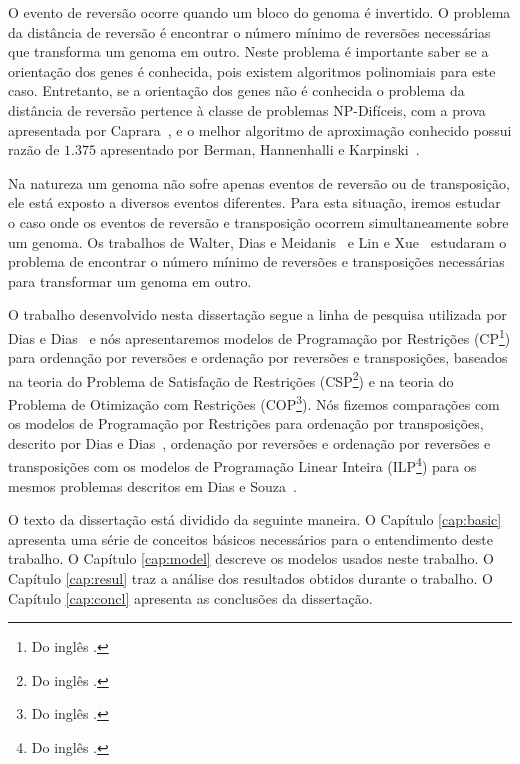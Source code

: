 O evento de reversão ocorre quando um bloco do genoma é invertido. O
problema da distância de reversão é encontrar o número mínimo de
reversões necessárias que transforma um genoma em outro. Neste
problema é importante saber se a orientação dos genes é conhecida,
pois existem algoritmos polinomiais para este caso. Entretanto, se a
orientação dos genes não é conhecida o problema da distância de
reversão pertence à classe de problemas NP-Difíceis, com a prova
apresentada por Caprara~\cite{Caprara*1997}, e o melhor algoritmo de
aproximação conhecido possui razão de $1.375$ apresentado por Berman,
Hannenhalli e Karpinski~\cite{BermanHannenhalliKarpinski*2002}.

Na natureza um genoma não sofre apenas eventos de reversão ou de
transposição, ele está exposto a diversos eventos diferentes. Para
esta situação, iremos estudar o caso onde os eventos de reversão e
transposição ocorrem simultaneamente sobre um genoma. Os trabalhos de
Walter, Dias e
Meidanis~\cite{MeidanisWalterDias*2002,WalterDiasMeidanis*1998} e Lin
e Xue~\cite{LinXue*1999} estudaram o problema de encontrar o número
mínimo de reversões e transposições necessárias para transformar um
genoma em outro.

O trabalho desenvolvido nesta dissertação segue a linha de pesquisa
utilizada por Dias e Dias~\cite{DiasDias*2009} e nós apresentaremos
modelos de Programação por Restrições (CP\footnote{Do
inglês .}) para ordenação por reversões e
ordenação por reversões e transposições, baseados na teoria do
Problema de Satisfação de Restrições (CSP\footnote{Do
inglês .}) e na teoria do
Problema de Otimização com Restrições (COP\footnote{Do
inglês .}). Nós fizemos
comparações com os modelos de Programação por Restrições para
ordenação por transposições, descrito por Dias e
Dias~\cite{DiasDias*2009}, ordenação por reversões e ordenação por
reversões e transposições com os modelos de Programação Linear Inteira
(ILP\footnote{Do inglês .}) para os
mesmos problemas descritos em Dias e Souza~\cite{DiasSouza*2007}.

O texto da dissertação está dividido da seguinte maneira. O
Capítulo \ref{cap:basic} apresenta uma série de conceitos básicos
necessários para o entendimento deste trabalho. O
Capítulo \ref{cap:model} descreve os modelos usados neste trabalho. O
Capítulo \ref{cap:resul} traz a análise dos resultados obtidos durante
o trabalho. O Capítulo \ref{cap:concl} apresenta as conclusões da
dissertação.
